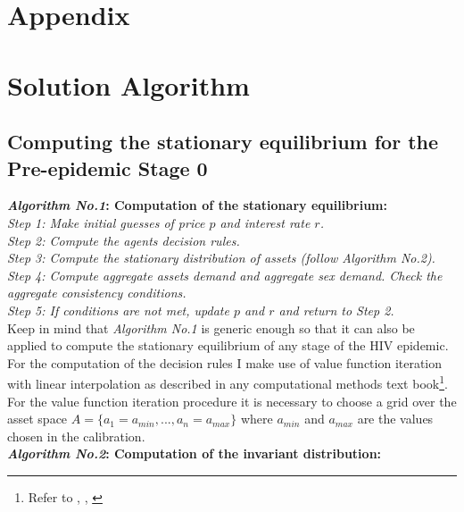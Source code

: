 \section{Appendix}


\section{Solution Algorithm}

\subsection*{Computing the stationary equilibrium for the Pre-epidemic Stage 0}

\noindent \textbf{\textit{Algorithm No.1}: Computation of the stationary equilibrium:}\\

\noindent\textit{Step 1: Make initial guesses of price $p$ and interest rate $r$.\\
Step 2: Compute the agents decision rules.\\
Step 3: Compute the stationary distribution of assets (follow Algorithm No.2).\\
Step 4: Compute aggregate assets demand and aggregate sex demand. Check the aggregate consistency conditions.\\
Step 5: If conditions are not met, update $p$ and $r$ and return to Step 2.
}\\

Keep in mind that \textit{Algorithm No.1} is generic enough so that it can also be applied to compute the stationary equilibrium of any stage of the HIV epidemic.\\

For the computation of the decision rules I make use of value function iteration with linear interpolation as described in any computational methods text book\footnote{Refer to \cite{mauss}, \cite{judd}, \cite{sargent}}. For the value function iteration procedure it is necessary to choose a grid over the asset space $A=\{a_{1}=a_{min},...,a_{n}=a_{max}\}$ where $a_{min}$ and $a_{max}$ are the values chosen in the calibration. \\

\noindent\textbf{\textit{Algorithm No.2}: Computation of the invariant distribution:}\\


